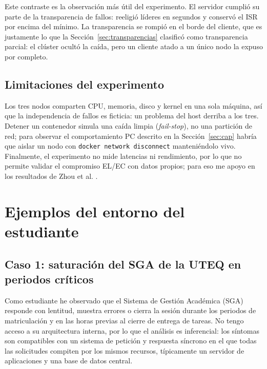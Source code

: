 \documentclass[11pt,a4paper]{article}
\begin{document}
Este contraste es la observación más útil del experimento. El servidor cumplió su parte de la transparencia de fallos: reeligió líderes en segundos y conservó el ISR por encima del mínimo. La transparencia se rompió en el borde del cliente, que es justamente lo que la Sección~\ref{sec:transparencias} clasificó como transparencia parcial: el clúster ocultó la caída, pero un cliente atado a un único nodo la expuso por completo.

\subsection{Limitaciones del experimento}

Los tres nodos comparten CPU, memoria, disco y kernel en una sola máquina, así que la independencia de fallos es ficticia: un problema del host derriba a los tres. Detener un contenedor simula una caída limpia (\emph{fail-stop}), no una partición de red; para observar el comportamiento PC descrito en la Sección~\ref{sec:cap} habría que aislar un nodo con \texttt{docker network disconnect} manteniéndolo vivo. Finalmente, el experimento no mide latencias ni rendimiento, por lo que no permite validar el compromiso EL/EC con datos propios; para eso me apoyo en los resultados de Zhou et al. \cite{zhou2024distributed}.

\section{Ejemplos del entorno del estudiante}

\subsection{Caso 1: saturación del SGA de la UTEQ en periodos críticos}

Como estudiante he observado que el Sistema de Gestión Académica (SGA) responde con lentitud, muestra errores o cierra la sesión durante los periodos de matriculación y en las horas previas al cierre de entrega de tareas. No tengo acceso a su arquitectura interna, por lo que el análisis es inferencial: los síntomas son compatibles con un sistema de petición y respuesta síncrono en el que todas las solicitudes compiten por los mismos recursos, típicamente un servidor de aplicaciones y una base de datos central.
\end{document}
